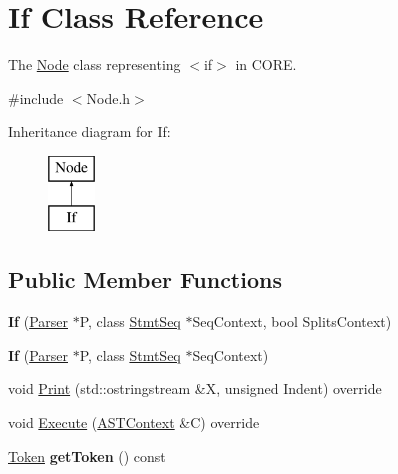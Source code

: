 \hypertarget{class_if}{}\section{If Class Reference}
\label{class_if}


The \mbox{\hyperlink{class_node}{Node}} class representing {\ttfamily $<$if$>$} in C\+O\+RE.  




{\ttfamily \#include $<$Node.\+h$>$}

Inheritance diagram for If\+:\begin{figure}[H]
\begin{center}
\leavevmode
\includegraphics[height=2.000000cm]{class_if}
\end{center}
\end{figure}
\subsection*{Public Member Functions}
\begin{DoxyCompactItemize}
\item 
\mbox{\label{class_if_a1df8a8b7ea79d3c05307cde5f7c682d2}} 
{\bfseries If} (\mbox{\hyperlink{class_parser}{Parser}} $\ast$P, class \mbox{\hyperlink{class_stmt_seq}{Stmt\+Seq}} $\ast$Seq\+Context, bool Splits\+Context)
\item 
\mbox{\label{class_if_ae20ec2a98ab404d4e6cef2f90382285b}} 
{\bfseries If} (\mbox{\hyperlink{class_parser}{Parser}} $\ast$P, class \mbox{\hyperlink{class_stmt_seq}{Stmt\+Seq}} $\ast$Seq\+Context)
\item 
void \mbox{\hyperlink{class_if_a3a58cc0b16902cc935c9edce7fc70ff6}{Print}} (std\+::ostringstream \&X, unsigned Indent) override
\item 
void \mbox{\hyperlink{class_if_a930c6955a625beebaa3e61527aacfa39}{Execute}} (\mbox{\hyperlink{class_a_s_t_context}{A\+S\+T\+Context}} \&C) override
\item 
\mbox{\label{class_if_af4894159c268eef501f4d02ef027a8de}} 
\mbox{\hyperlink{class_token}{Token}} {\bfseries get\+Token} () const
\end{DoxyCompactItemize}
